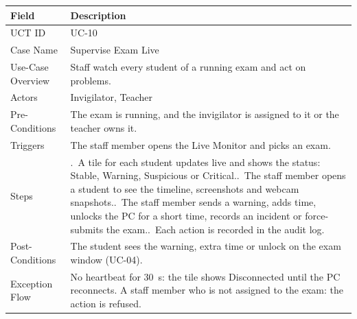 \begin{lrbox}{\uctbox}{\small\renewcommand{\arraystretch}{1.1}\setlength{\tabcolsep}{6pt}%
\begin{tabular}{>{\raggedright\arraybackslash}p{3.6cm}>{\raggedright\arraybackslash}p{\dimexpr\textwidth-3.6cm-4\tabcolsep\relax}}
\hline\hline
\textbf{Field} & \textbf{Description} \\ \hline
UCT ID & UC-10 \\
Case Name & Supervise Exam Live \\
Use-Case Overview & Staff watch every student of a running exam and act on problems. \\
Actors & Invigilator, Teacher \\
Pre-Conditions & The exam is running, and the invigilator is assigned to it or the teacher owns it. \\
Triggers & The staff member opens the Live Monitor and picks an exam. \\
Steps & 1.~A tile for each student updates live and shows the status: Stable, Warning, Suspicious or Critical.\newline
2.~The staff member opens a student to see the timeline, screenshots and webcam snapshots.\newline
3.~The staff member sends a warning, adds time, unlocks the PC for a short time, records an incident or force-submits the exam.\newline
4.~Each action is recorded in the audit log. \\
Post-Conditions & The student sees the warning, extra time or unlock on the exam window (UC-04). \\
Exception Flow & No heartbeat for 30~s: the tile shows Disconnected until the PC reconnects. A staff member who is not assigned to the exam: the action is refused. \\
\hline\hline
\end{tabular}}\end{lrbox}
\begin{table}[H]
\centering
\caption{Use Case Table for Supervise Exam Live}\label{tab:uc10}
\vspace{4pt}
\usebox{\uctbox}
\end{table}

